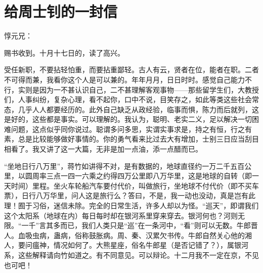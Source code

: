 \section[给周士钊的一封信（一九五八年十一月二十五日）]{给周士钊的一封信}


惇元兄：

赐书收到。十月十七日的，读了高兴。

受任新职，不要拈轻怕重，而要拈重鄙轻。古人有云，贤者在位，能者在职。二者不可得而兼，我看你这个人是可以兼的。年年月月，日日时时。感觉自己能力不行，实则是因为一不甚认识自己，二不甚理解客观事物——那些留学生们，大教授们，人事纠纷，复杂心理，看不起你，口中不说，目笑存之，如此等类这些社会常态，几乎人人都要经历的。此外自己缺乏从政经验，临事而惧，陈力而后就列，这是好的，这些都是事实。可以理解的。我认为，聪明、老实二义，足以解决一切困难问题，这点似乎同你说过。聪谓多问多思，实谓实事求是，持之有恒，行之有素，总是比较能够做好事情的。你的勇气看来比过去大有增加，士别三日应当刮目相看了。我又讲了这一大篇，无非是加一点油，添一点醋而已。

“坐地日行八万里”，蒋竹如讲得不对，是有数据的，地球直径约一万二千五百公里，以圆周率三点一四一六乘之约得四万公里即八万华里，这是地球的自转（即一天时间）里程。坐火车轮船汽车要付代价，叫做旅行，坐地球不付代价（即不买车票），日行八万华里，问人这是旅行么？答曰，不是，我一动也没动，真是岂有此理！囿于习俗，迷信未除。完全的日常生活，许多人却以为怪。“巡天”，即谓我们这个太阳系（地球在内）每日每时却在银河系里穿来穿去。银河何也？河则无限。“一千”言其多而已，我们人类只是“巡”在一条河中，“看”则可以无数。牛郎晋人。血吸虫病，蛊病，俗称鼓胀病。周、秦、汉累欠书传。牛郎自然关心他的湘人，要问瘟神，情况如何了。大熊星座，俗名牛郎星（是否记错了？），属银河系，这些解释请向竹如道之。有不同意见。可以辩论。十二月我不一定在京，不见也可吧！


